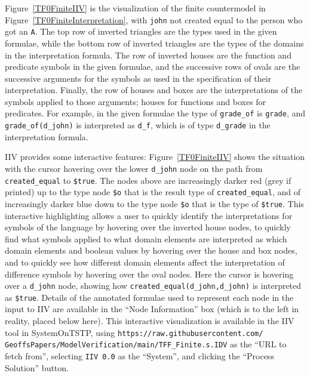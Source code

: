 \documentclass[letterpaper]{article}
\newcommand{\smalltt}[1]{\small \texttt{#1}}
\begin{document}
Figure~\ref{TF0FiniteIIV} is the visualization of the finite countermodel in 
Figure~\ref{TF0FiniteInterpretation}, with {\smalltt{john}} not created equal to the person
who got an {\smalltt{A}}.
The top row of inverted triangles are the types used in the given formulae,
while the bottom row of inverted triangles are the types of the domains in the interpretation
formula.
The row of inverted houses are the function and predicate symbols in the given formulae,
and the successive rows of ovals are the successive arguments for the symbols as used in the
specification of their interpretation.
Finally, the row of houses and boxes are the interpretations of the symbols applied to those
arguments; houses for functions and boxes for predicates.
For example, in the given formulae the type of {\smalltt{grade\_of}} is {\smalltt{grade}},
and {\smalltt{grade\_of(d\_john)}} is interpreted as {\smalltt{d\_f}}, which is of type
{\smalltt{d\_grade}} in the interpretation formula.

IIV provides some interactive features: Figure~\ref{TF0FiniteIIV} shows the situation with 
the cursor hovering over the lower {\smalltt{d\_john}} node on the path from 
{\smalltt{created\_equal}} to {\smalltt{\$true}}.
The nodes above are increasingly darker red (grey if printed) up to the type node {\smalltt{\$o}} 
that is the result type of {\smalltt{created\_equal}}, and of increasingly darker blue down to 
the type node {\smalltt{\$o}} that is the type of {\smalltt{\$true}}.
This interactive highlighting allows a user to quickly identify the interpretations for symbols
of the language by hovering over the inverted house nodes, to quickly find what symbols applied to
what domain elements are interpreted as which domain elements and boolean values by hovering over
the house and box nodes, and to quickly see how different domain elements affect the interpretation
of difference symbols by hovering over the oval nodes.
Here the cursor is hovering over a {\smalltt{d\_john}} node, showing how
{\smalltt{created\_equal(d\_john,d\_john)}} is interpreted as {\smalltt{\$true}}.
Details of the annotated formulae used to represent each node in the input to IIV are available 
in the ``Node Information'' box (which is to the left in reality, placed below here).
This interactive visualization is available in the IIV tool in SystemOnTSTP, using 
{\scriptsize {\tt https://raw.githubusercontent.com/ GeoffsPapers/ModelVerification/main/TFF\_Finite.s.IDV}}
as the ``URL to fetch from'', selecting {\tt IIV 0.0} as the ``System'', and clicking the
``Process Solution'' button.
\end{document}
